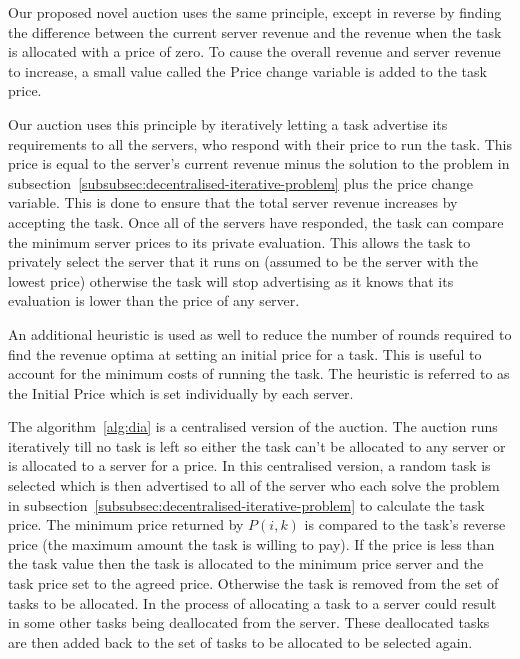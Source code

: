 Our proposed novel auction uses the same principle, except in reverse by finding the difference between the current
server revenue and the revenue when the task is allocated with a price of zero. To cause the overall revenue and
server revenue to increase, a small value called the Price change variable is added to the task price.

Our auction uses this principle by iteratively letting a task advertise its requirements to all the servers, who
respond with their price to run the task. This price is equal to the server's current revenue minus the solution to the
problem in subsection~\ref{subsubsec:decentralised-iterative-problem} plus the price change variable. This is done to
ensure that the total server revenue increases by accepting the task. Once all of the servers have responded, the task
can compare the minimum server prices to its private evaluation. This allows the task to privately select the server
that it runs on (assumed to be the server with the lowest price) otherwise the task will stop advertising as it knows
that its evaluation is lower than the price of any server.

An additional heuristic is used as well to reduce the number of rounds required to find the revenue optima at setting
an initial price for a task. This is useful to account for the minimum costs of running the task. The heuristic
is referred to as the Initial Price which is set individually by each server.

The algorithm~\ref{alg:dia} is a centralised version of the auction. The auction runs iteratively till no task is left
so either the task can't be allocated to any server or is allocated to a server for a price. In this centralised version,
a random task is selected which is then advertised to all of the server who each solve the problem in
subsection~\ref{subsubsec:decentralised-iterative-problem} to calculate the task price. The minimum price returned by
$P(i, k)$ is compared to the task's reverse price (the maximum amount the task is willing to pay). If the price is less
than the task value then the task is allocated to the minimum price server and the task price set to the agreed price.
Otherwise the task is removed from the set of tasks to be allocated. In the process of allocating a task to a server
could result in some other tasks being deallocated from the server. These deallocated tasks are then added back to the
set of tasks to be allocated to be selected again.

